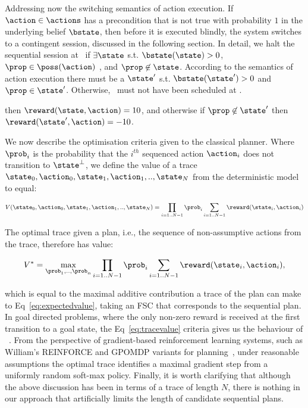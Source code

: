 Addressing now the switching semantics of action execution. If
$\action\in\actions$ has a precondition that is not true with
probability $1$ in the underlying belief $\bstate$, then before it is
executed blindly, the system switches to a contingent session,
discussed in the following section. In detail, we halt the sequential
session at \action\ if $\exists
\state$ s.t. $\bstate(\state)>0$, 
$\prop\in\poss(\action)$ , and $\prop\not\in\state$. According to the
semantics of action execution there must be a $\state'$ s.t.
$\bstate(\state')>0$ and $\prop\in\state'$. Otherwise, \action\ must
not have been scheduled at \bstate.


then $\reward(\state,\action)=10$, and
otherwise if $\prop\not\in\state'$ then
$\reward(\state',\action)=-10$.


We now describe the optimisation criteria given to the classical
planner. Where $\prob_i$ is the probability that the $i^{th}$
sequenced action $\action_i$ does not transition to $\state^\bot$, we
define the value of a trace
$\state_0, \action_0, \state_1, \action_1,.., \state_N$ from the
deterministic model to equal:

\begin{equation}\label{eq:tracevalue}
V(\state_0, \action_0, \state_1, \action_1,.., \state_N) =  \prod_{i=1..N-1} \prob_i \sum_{i=1..N-1} \reward(\state_i, \action_i)
\end{equation}

\noindent The optimal trace given a plan, i.e., the sequence of non-assumptive
actions from the trace, therefore has value:

\[
V^* = \max_{\prob_1, .., \prob_n} \prod_{i=1..N-1} \prob_i \sum_{i=1..N-1}
\reward(\state_i, \action_i),
\]

\noindent which is equal to the maximal additive contribution a trace of the plan can
make to Eq~\ref{eq:expectedvalue}, taking an FSC that corresponds to
the sequential plan.  In goal directed problems, where the only
non-zero reward is received at the first transition to a goal state,
the Eq~\ref{eq:tracevalue} criteria gives us the behaviour
of ~\cite{yoon:etal:2007}. From the perspective of
gradient-based reinforcement learning systems, such as William's
REINFORCE and GPOMDP variants for planning~\cite{olivier:doug:2009},
under reasonable assumptions the optimal trace identifies a maximal
gradient step from a uniformly random soft-max policy. Finally, it is
worth clarifying that although the above discussion has been in terms
of a trace of length $N$, there is nothing in our approach that
artificially limits the length of candidate sequential plans.


